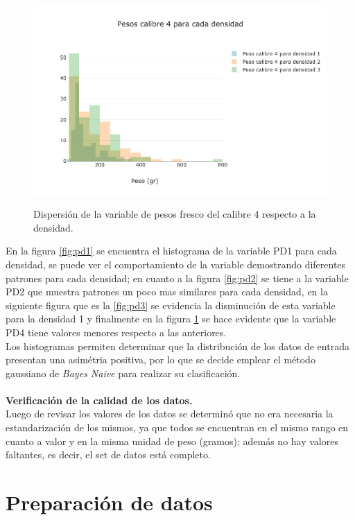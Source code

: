 \begin{figure}[h!]
	\caption{Dispersión de la variable de pesos fresco del calibre 4 respecto a la densidad.}
	\centering
	\includegraphics[scale=0.6]{PD4.png}
	\label{fig:pd4}
\end{figure}

En la figura \ref{fig:pd1} se encuentra el histograma de la variable PD1 para cada densidad, se puede ver el comportamiento de la variable demostrando diferentes patrones para cada densidad; en cuanto a la figura \ref{fig:pd2} se tiene a la variable PD2 que muestra patrones un poco mas similares para cada densidad, en la siguiente figura que es la \ref{fig:pd3} se evidencia la disminución de esta variable para la densidad 1 y finalmente en la figura \ref{fig:pd4} se hace evidente que la variable PD4 tiene valores menores respecto a las anteriores.\\

Los histogramas permiten determinar que la distribución de los datos de entrada presentan  una asimétria positiva, por lo que se decide  emplear el método gaussiano de \textit{Bayes Naive} para realizar su clasificación.\\\\

\noindent
\textbf{Verificación de la calidad de los datos.}\\

Luego de revisar los valores de los datos se determinó que no era necesaria la estandarización de los mismos, ya que todos se encuentran en el mismo rango en cuanto a valor y en la misma unidad de peso (gramos); además no hay valores faltantes, es decir, el set de datos está completo.

\section{Preparación de datos}

